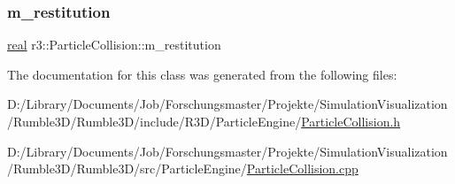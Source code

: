 \mbox{\label{classr3_1_1_particle_collision_a02dd7e5f227a429bcb707ad46adeb292}} 
\subsubsection{\texorpdfstring{m\+\_\+restitution}{m\_restitution}}
{\footnotesize\ttfamily \mbox{\hyperlink{namespacer3_ab2016b3e3f743fb735afce242f0dc1eb}{real}} r3\+::\+Particle\+Collision\+::m\+\_\+restitution\hspace{0.3cm}{\ttfamily [protected]}}



The documentation for this class was generated from the following files\+:\begin{DoxyCompactItemize}
\item 
D\+:/\+Library/\+Documents/\+Job/\+Forschungsmaster/\+Projekte/\+Simulation\+Visualization/\+Rumble3\+D/\+Rumble3\+D/include/\+R3\+D/\+Particle\+Engine/\mbox{\hyperlink{_particle_collision_8h}{Particle\+Collision.\+h}}\item 
D\+:/\+Library/\+Documents/\+Job/\+Forschungsmaster/\+Projekte/\+Simulation\+Visualization/\+Rumble3\+D/\+Rumble3\+D/src/\+Particle\+Engine/\mbox{\hyperlink{_particle_collision_8cpp}{Particle\+Collision.\+cpp}}\end{DoxyCompactItemize}
